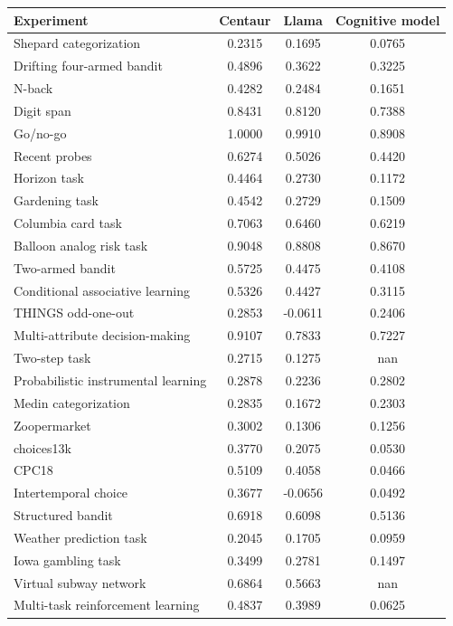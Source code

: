 \documentclass[pdflatex,sn-nature]{sn-jnl}%
\theoremstyle{thmstyleone}%
\theoremstyle{thmstyletwo}%
\theoremstyle{thmstylethree}%
\begin{document}
\begin{table}[h]
\centering 
\begin{tabular}{@{}lccc@{}} 
\toprule  
\textbf{Experiment} & \textbf{Centaur} & \textbf{Llama} & \textbf{Cognitive model} \\ 
\midrule 
Shepard categorization & 0.2315 & 0.1695 & 0.0765 \\ 
Drifting four-armed bandit & 0.4896 & 0.3622 & 0.3225 \\ 
N-back & 0.4282 & 0.2484 & 0.1651 \\ 
Digit span & 0.8431 & 0.8120 & 0.7388 \\ 
Go/no-go & 1.0000 & 0.9910 & 0.8908 \\ 
Recent probes & 0.6274 & 0.5026 & 0.4420 \\ 
Horizon task & 0.4464 & 0.2730 & 0.1172 \\ 
Gardening task & 0.4542 & 0.2729 & 0.1509 \\ 
Columbia card task & 0.7063 & 0.6460 & 0.6219 \\ 
Balloon analog risk task & 0.9048 & 0.8808 & 0.8670 \\ 
Two-armed bandit & 0.5725 & 0.4475 & 0.4108 \\ 
Conditional associative learning & 0.5326 & 0.4427 & 0.3115 \\ 
THINGS odd-one-out & 0.2853 & -0.0611 & 0.2406 \\ 
Multi-attribute decision-making & 0.9107 & 0.7833 & 0.7227 \\ 
Two-step task & 0.2715 & 0.1275 & nan \\ 
Probabilistic instrumental learning & 0.2878 & 0.2236 & 0.2802 \\ 
Medin categorization & 0.2835 & 0.1672 & 0.2303 \\ 
Zoopermarket & 0.3002 & 0.1306 & 0.1256 \\ 
choices13k & 0.3770 & 0.2075 & 0.0530 \\ 
CPC18 & 0.5109 & 0.4058 & 0.0466 \\ 
Intertemporal choice & 0.3677 & -0.0656 & 0.0492 \\ 
Structured bandit & 0.6918 & 0.6098 & 0.5136 \\ 
Weather prediction task & 0.2045 & 0.1705 & 0.0959 \\ 
Iowa gambling task & 0.3499 & 0.2781 & 0.1497 \\ 
Virtual subway network & 0.6864 & 0.5663 & nan \\ 
Multi-task reinforcement learning & 0.4837 & 0.3989 & 0.0625 \\ 

\end{tabular}
\end{table}
\end{document}
